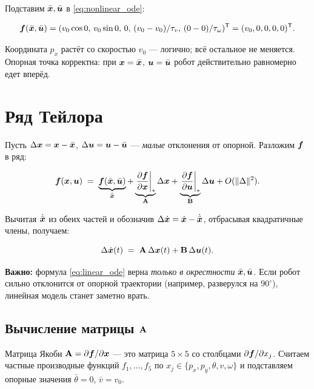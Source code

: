 Подставим $\bar{\bm{x}}, \bar{\bm{u}}$ в \eqref{eq:nonlinear_ode}:

\[
  \bm{f}(\bar{\bm{x}}, \bar{\bm{u}}) =
  (v_0\cos 0,\, v_0\sin 0,\, 0,\, (v_0 - v_0)/\tau_v,\, (0-0)/\tau_\omega)^{\mathsf{T}}
  = (v_0, 0, 0, 0, 0)^{\mathsf{T}}.
\]

Координата $p_x$ растёт со скоростью $v_0$ --- логично; всё остальное
не меняется. Опорная точка корректна: при $\bm{x} = \bar{\bm{x}}$,
$\bm{u} = \bar{\bm{u}}$ робот действительно равномерно едет
вперёд.

\section{Ряд Тейлора}

Пусть $\Delta\bm{x} = \bm{x} - \bar{\bm{x}}$,
$\Delta\bm{u} = \bm{u} - \bar{\bm{u}}$ --- \emph{малые}
отклонения от опорной. Разложим $\bm{f}$ в ряд:

\[
  \bm{f}(\bm{x}, \bm{u}) \;=\;
    \underbrace{\bm{f}(\bar{\bm{x}}, \bar{\bm{u}})}_{\dot{\bar{\bm{x}}}}
    +
    \underbrace{\left.\frac{\partial \bm{f}}{\partial \bm{x}}\right|_*}_{\mathbf{A}}
    \Delta\bm{x}
    +
    \underbrace{\left.\frac{\partial \bm{f}}{\partial \bm{u}}\right|_*}_{\mathbf{B}}
    \Delta\bm{u}
    + O(\|\Delta\|^2).
\]

Вычитая $\dot{\bar{\bm{x}}}$ из обеих частей и обозначив
$\Delta\dot{\bm{x}} = \dot{\bm{x}} - \dot{\bar{\bm{x}}}$, отбрасывая
квадратичные члены, получаем:

\begin{formulabox}[title={Линеаризованная модель}]
\begin{equation}
  \Delta\dot{\bm{x}}(t) \;=\; \mathbf{A}\,\Delta\bm{x}(t)
                                 + \mathbf{B}\,\Delta\bm{u}(t).
  \label{eq:linear_ode}
\end{equation}
\end{formulabox}

\textbf{Важно:} формула \eqref{eq:linear_ode} верна \emph{только в окрестности}
$\bar{\bm{x}}, \bar{\bm{u}}$. Если робот сильно отклонится от опорной
траектории (например, разверулся на $90^\circ$), линейная модель станет
заметно врать.

\subsection{Вычисление матрицы $\mathbf{A}$}

Матрица Якоби $\mathbf{A} = \partial \bm{f}/\partial \bm{x}$ --- это
матрица $5 \times 5$ со столбцами $\partial \bm{f}/\partial x_j$.
Считаем частные производные функций $f_1, \ldots, f_5$ по $x_j \in \{p_x,
p_y, \theta, v, \omega\}$ и подставляем опорные значения
$\bar{\theta} = 0$, $\bar{v} = v_0$.

